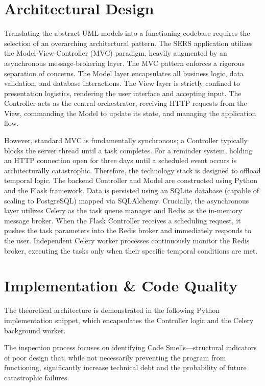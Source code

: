 \section{Architectural Design}
Translating the abstract UML models into a functioning codebase requires the selection of an overarching architectural pattern. The SERS application utilizes the Model-View-Controller (MVC) paradigm, heavily augmented by an asynchronous message-brokering layer. The MVC pattern enforces a rigorous separation of concerns. The Model layer encapsulates all business logic, data validation, and database interactions. The View layer is strictly confined to presentation logistics, rendering the user interface and accepting input. The Controller acts as the central orchestrator, receiving HTTP requests from the View, commanding the Model to update its state, and managing the application flow.

However, standard MVC is fundamentally synchronous; a Controller typically blocks the server thread until a task completes. For a reminder system, holding an HTTP connection open for three days until a scheduled event occurs is architecturally catastrophic. Therefore, the technology stack is designed to offload temporal logic. The backend Controller and Model are constructed using Python and the Flask framework. Data is persisted using an SQLite database (capable of scaling to PostgreSQL) mapped via SQLAlchemy. Crucially, the asynchronous layer utilizes Celery as the task queue manager and Redis as the in-memory message broker. When the Flask Controller receives a scheduling request, it pushes the task parameters into the Redis broker and immediately responds to the user. Independent Celery worker processes continuously monitor the Redis broker, executing the tasks only when their specific temporal conditions are met.

\section{Implementation \& Code Quality}
The theoretical architecture is demonstrated in the following Python implementation snippet, which encapsulates the Controller logic and the Celery background worker.


The inspection process focuses on identifying Code Smells—structural indicators of poor design that, while not necessarily preventing the program from functioning, significantly increase technical debt and the probability of future catastrophic failures.

